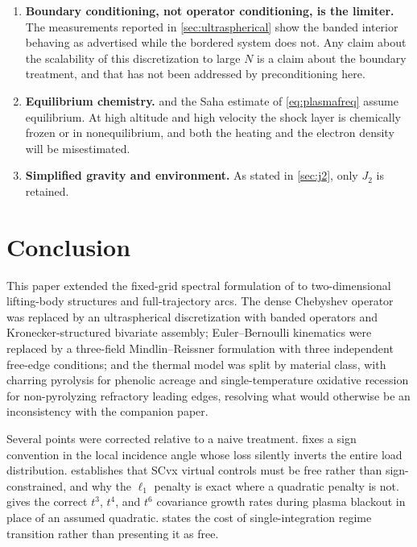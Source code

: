 \documentclass[11pt,a4paper]{article}
\theoremstyle{definition}
\numberwithin{equation}{section}
\begin{document}
\begin{enumerate}
    \item \textbf{Boundary conditioning, not operator conditioning, is the limiter.} The measurements reported in \cref{sec:ultraspherical} show the banded interior behaving as advertised while the bordered system does not. Any claim about the scalability of this discretization to large $N$ is a claim about the boundary treatment, and that has not been addressed by preconditioning here.

    \item \textbf{Equilibrium chemistry.}  and the Saha estimate of \cref{eq:plasmafreq} assume equilibrium. At high altitude and high velocity the shock layer is chemically frozen or in nonequilibrium, and both the heating and the electron density will be misestimated.

    \item \textbf{Simplified gravity and environment.} As stated in \cref{sec:j2}, only $J_2$ is retained.
\end{enumerate}

\section{Conclusion}
\label{sec:conclusion}

This paper extended the fixed-grid spectral formulation of \cite{knox2026passes} to two-dimensional lifting-body structures and full-trajectory arcs. The dense Chebyshev operator was replaced by an ultraspherical discretization with banded operators and Kronecker-structured bivariate assembly; Euler--Bernoulli kinematics were replaced by a three-field Mindlin--Reissner formulation with three independent free-edge conditions; and the thermal model was split by material class, with charring pyrolysis for phenolic acreage and single-temperature oxidative recession for non-pyrolyzing refractory leading edges, resolving what would otherwise be an inconsistency with the companion paper.

Several points were corrected relative to a naive treatment.  fixes a sign convention in the local incidence angle whose loss silently inverts the entire load distribution.  establishes that SCvx virtual controls must be free rather than sign-constrained, and why the $\ell_1$ penalty is exact where a quadratic penalty is not.  gives the correct $t^3$, $t^4$, and $t^6$ covariance growth rates during plasma blackout in place of an assumed quadratic.  states the cost of single-integration regime transition rather than presenting it as free.
\end{document}

